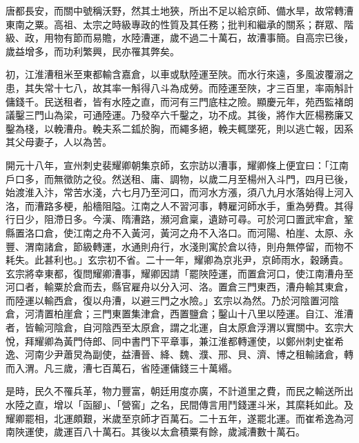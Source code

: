 
\begin{pinyinscope}

 唐都長安，而關中號稱沃野，然其土地狹，所出不足以給京師、備水旱，故常轉漕東南之粟。高祖、太宗之時級專政的性質及其任務；批判和繼承的關系；群眾、階級、政，用物有節而易贍，水陸漕運，歲不過二十萬石，故漕事簡。自高宗已後，歲益增多，而功利繁興，民亦罹其弊矣。



 初，江淮漕租米至東都輸含嘉倉，以車或馱陸運至陜。而水行來遠，多風波覆溺之患，其失常十七八，故其率一斛得八斗為成勞。而陸運至陜，才三百里，率兩斛計傭錢千。民送租者，皆有水陸之直，而河有三門底柱之險。顯慶元年，苑西監褚朗議鑿三門山為梁，可通陸運。乃發卒六千鑿之，功不成。其後，將作大匠楊務廉又鑿為棧，以輓漕舟。輓夫系二鈲於胸，而繩多絕，輓夫輒墜死，則以逃亡報，因系其父母妻子，人以為苦。



 開元十八年，宣州刺史裴耀卿朝集京師，玄宗訪以漕事，耀卿條上便宜曰：「江南戶口多，而無徵防之役。然送租、庸、調物，以歲二月至楊州入斗門，四月已後，始渡淮入汴，常苦水淺，六七月乃至河口，而河水方漲，須八九月水落始得上河入洛，而漕路多梗，船檣阻隘。江南之人不習河事，轉雇河師水手，重為勞費。其得行日少，阻滯日多。今漢、隋漕路，瀕河倉稟，遺跡可尋。可於河口置武牢倉，鞏縣置洛口倉，使江南之舟不入黃河，黃河之舟不入洛口。而河陽、柏崖、太原、永豐、渭南諸倉，節級轉運，水通則舟行，水淺則寓於倉以待，則舟無停留，而物不耗失。此甚利也。」玄宗初不省。二十一年，耀卿為京兆尹，京師雨水，穀踴貴。玄宗將幸東都，復問耀卿漕事，耀卿因請「罷陜陸運，而置倉河口，使江南漕舟至河口者，輸粟於倉而去，縣官雇舟以分入河、洛。置倉三門東西，漕舟輸其東倉，而陸運以輸西倉，復以舟漕，以避三門之水險。」玄宗以為然。乃於河陰置河陰倉，河清置柏崖倉；三門東置集津倉，西置鹽倉；鑿山十八里以陸運。自江、淮漕者，皆輸河陰倉，自河陰西至太原倉，謂之北運，自太原倉浮渭以實關中。玄宗大悅，拜耀卿為黃門侍郎、同中書門下平章事，兼江淮都轉運使，以鄭州刺史崔希逸、河南少尹蕭炅為副使，益漕晉、絳、魏、濮、邢、貝、濟、博之租輸諸倉，轉而入渭。凡三歲，漕七百萬石，省陸運傭錢三十萬緡。



 是時，民久不罹兵革，物力豐富，朝廷用度亦廣，不計道里之費，而民之輸送所出水陸之直，增以「函腳」、「營窖」之名，民間傳言用鬥錢運斗米，其縻耗如此。及耀卿罷相，北運頗艱，米歲至京師才百萬石。二十五年，遂罷北運。而崔希逸為河南陜運使，歲運百八十萬石。其後以太倉積粟有餘，歲減漕數十萬石。




\end{pinyinscope}
